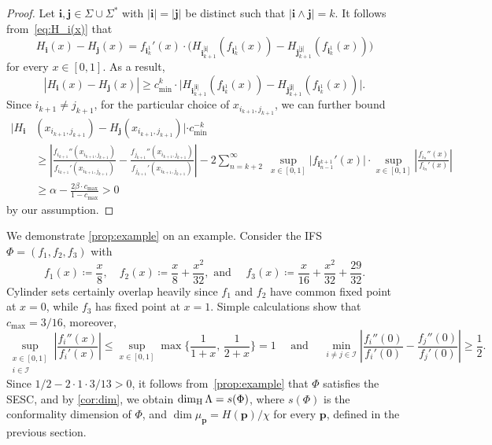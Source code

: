 \documentclass[12pt,]{article}
\def\cref#1{\ref{#1}}%
\theoremstyle{definition}
\theoremstyle{remark}
\newcommand{\0}{\mathbf{0}}
\newcommand{\bi}{\mathbf{i}}
\newcommand{\bj}{\mathbf{j}}
\begin{document}
\begin{proof}
  Let $\bi,\bj \in\Sigma\cup\Sigma^*$ with $|\bi|=|\bj|$ be distinct such that $|\bi\wedge \bj|=k$. It
  follows from~\cref{eq:H_i(x)} that
  \begin{equation*}
    H_{\bi}(x)-H_{\bj}(x) = f_{\bi_k^1}'(x)\cdot \big( H_{\bi_{k+1}^{|\bi|}}(f_{\bi_k^1}(x)) -
    H_{\bj_{k+1}^{|\bj|}}(f_{\bi_k^1}(x)) \big)
\end{equation*}
for every $x\in[0,1]$. As a result,
\begin{equation*}
|H_{\bi}(x)-H_{\bj}(x)| \geq c_{\min}^k\cdot \big| H_{\bi_{k+1}^{|\bi|}}(f_{\bi_k^1}(x)) -
H_{\bj_{k+1}^{|\bj|}}(f_{\bi_k^1}(x)) \big|.
\end{equation*}
Since $i_{k+1}\neq j_{k+1}$, for the particular choice of $x_{i_{k+1},j_{k+1}}$, we can further bound 
\begin{align*}
|H_{\bi}&(x_{i_{k+1},j_{k+1}}) - H_{\bj}(x_{i_{k+1},j_{k+1}})|\cdot c_{\min}^{-k} \\
&\geq \left| \frac{f_{i_{k+1}}''(x_{i_{k+1},j_{k+1}})}{f_{i_{k+1}}'(x_{i_{k+1},j_{k+1}})} -
\frac{f_{j_{k+1}}''(x_{i_{k+1},j_{k+1}})}{f_{j_{k+1}}'(x_{i_{k+1},j_{k+1}})} \right| - 2
\sum_{n=k+2}^{\infty}\; \sup_{x\in[0,1]} \big| f_{\bi_{n-1}^{k+1}}'(x) \big| \cdot \sup_{x\in[0,1]}
\left| \frac{f_{i_n}''(x)}{f_{i_n}'(x)} \right| \\
&\geq \alpha -  \frac{2\beta\cdot c_{\max}}{1-c_{\max}} >0
\end{align*}
by our assumption.
\end{proof}

We demonstrate \cref{prop:example} on an example. Consider the IFS $\Phi=(f_1,f_2,f_3)$ with
\begin{equation*}%
f_1(x)\coloneqq \frac{x}{8}, \quad f_2(x)\coloneqq \frac{x}{8} + \frac{x^2}{32}, \text{ and } \quad
f_3(x)\coloneqq \frac{x}{16} + \frac{x^2}{32} + \frac{29}{32}. 
\end{equation*}
Cylinder sets certainly overlap heavily since $f_1$ and $f_2$ have common fixed point at $x=0$,
while $f_3$ has fixed point at $x=1$. Simple calculations show that $c_{\max}=3/16$, moreover,
\begin{equation*}
\sup_{\substack{x\in[0,1] \\ i\in\mathcal{I}}} \left| \frac{f_i''(x)}{f_i'(x)} \right| \leq
\sup_{x\in[0,1]} \max\Big\{\frac{1}{1+x},\, \frac{1}{2+x} \Big\} = 1 \quad\text{ and }\quad
\min_{i\neq j\in\mathcal{I}}\left| \frac{f_i''(0)}{f_i'(0)} - \frac{f_j''(0)}{f_j'(0)} \right| \geq
\frac{1}{2} .
\end{equation*}
Since $1/2-2\cdot 1\cdot 3/13>0$, it follows from~\cref{prop:example} that $\Phi$ satisfies the
SESC, and by \cref{cor:dim}, we obtain $\dim_{\rm H}\Lambda=s(\Phi)$, where $s(\Phi)$ is the
conformality dimension of $\Phi$, and $\dim \mu_{\mathbf{p}} =  H(\mathbf{p})/\chi$ for
every $\mathbf{p}$, defined in the previous section. 
\end{document}
